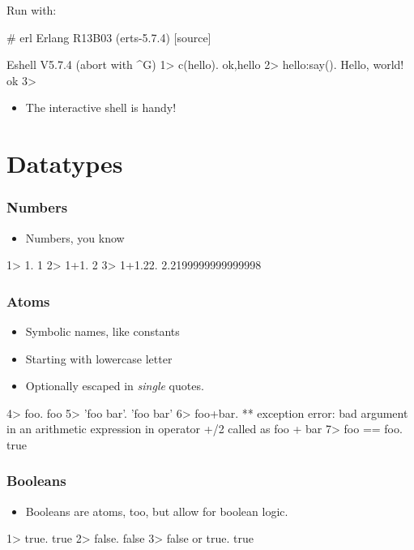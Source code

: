 \documentclass{beamer}
\begin{document}
\begin{frame}[fragile]
Run with:

  \begin{semiverbatim}
# erl
Erlang R13B03 (erts-5.7.4) [source] 

Eshell V5.7.4  (abort with ^G)
1> c(hello).
{ok,hello}
2> hello:say().
Hello, world!
ok
3> 
  \end{semiverbatim}
  
  \begin{itemize}
  \item The interactive shell is handy!  
  \end{itemize}

\end{frame}


\section{Datatypes}

\begin{frame}[fragile]
  \frametitle{Numbers}

  \begin{itemize}
  \item Numbers, you know
  \end{itemize}

  \begin{semiverbatim}
1> 1.
1
2> 1+1.
2
3> 1+1.22.
2.2199999999999998

  \end{semiverbatim}

\end{frame}


\begin{frame}[fragile]
  \frametitle{Atoms}
  \begin{itemize}
  \item Symbolic names, like constants
  \item Starting with lowercase letter
  \item Optionally escaped in {\em single} quotes.
  \end{itemize}
  \begin{semiverbatim}
4> foo.
foo
5> 'foo bar'.
'foo bar'
6> foo+bar.
** exception error: bad argument in an arithmetic expression
     in operator  +/2
        called as foo + bar
7> foo == foo.
true
  \end{semiverbatim}

\end{frame}


\begin{frame}[fragile]
  \frametitle{Booleans}
  \begin{itemize}
  \item Booleans are atoms, too, but allow for boolean logic.
  \end{itemize}

  \begin{semiverbatim}
1> true.
true
2> false.
false
3> false or true.
true
  \end{semiverbatim}

\end{frame}
\end{document}
